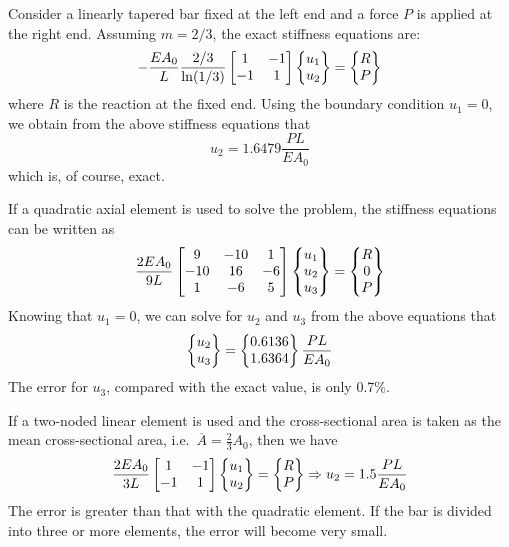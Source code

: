 \begin{example}
Consider a linearly tapered bar fixed at the left end and a force $P$ is applied at the right end. Assuming $m = 2/3$, the exact stiffness equations are:
\begin{equation*}
  -\frac{EA_0}{L}\frac{2/3}{\ln(1/3)}\begin{bmatrix}1 & -1\\ -1 & 1\end{bmatrix}\begin{Bmatrix}u_1\\ u_2\end{Bmatrix} = \begin{Bmatrix}R\\ P\end{Bmatrix}
\end{equation*}
where $R$ is the reaction at the fixed end. Using the boundary condition $u_1 = 0$, we obtain from the above stiffness equations that
\begin{equation*}
  u_2 = 1.6479\frac{PL}{EA_0}
\end{equation*}
which is, of course, exact.

If a quadratic axial element is used to solve the problem, the stiffness equations can be written as
\begin{equation*}
  \frac{2EA_0}{9L}\begin{bmatrix}9 & -10 & 1\\ -10 & 16 & -6\\ 1 & -6 & 5\end{bmatrix}\begin{Bmatrix}u_1\\ u_2\\ u_3\end{Bmatrix} = \begin{Bmatrix}R\\ 0\\ P\end{Bmatrix}
\end{equation*}
Knowing that $u_1 = 0$, we can solve for $u_2$ and $u_3$ from the above equations that
\begin{equation*}
  \begin{Bmatrix}u_2\\ u_3\end{Bmatrix} = \begin{Bmatrix}0.6136\\ 1.6364\end{Bmatrix}\frac{PL}{EA_0}
\end{equation*}
The error for $u_3$, compared with the exact value, is only 0.7\%.

If a two-noded linear element is used and the cross-sectional area is taken as the mean cross-sectional area, i.e.\ $\overline{A} = \frac23A_0$, then we have
\begin{equation*}
  \frac{2EA_0}{3L}\begin{bmatrix}1 & -1\\ -1 & 1\end{bmatrix}\begin{Bmatrix}u_1\\ u_2\end{Bmatrix} = \begin{Bmatrix}R\\ P\end{Bmatrix} \Rightarrow u_2 = 1.5\frac{PL}{EA_0}
\end{equation*}
The error is greater than that with the quadratic element. If the bar is divided into three or more elements, the error will become very small.
\end{example}

